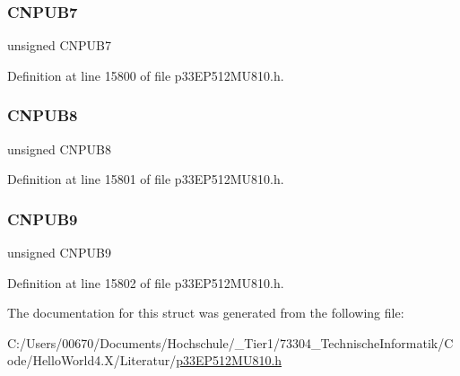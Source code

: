 \subsubsection{\texorpdfstring{C\+N\+P\+U\+B7}{CNPUB7}}
{\footnotesize\ttfamily unsigned C\+N\+P\+U\+B7}



Definition at line 15800 of file p33\+E\+P512\+M\+U810.\+h.

\mbox{\label{structtag_c_n_p_u_b_b_i_t_s_aaae4caa65429753f8714c166e77202b1}} 
\subsubsection{\texorpdfstring{C\+N\+P\+U\+B8}{CNPUB8}}
{\footnotesize\ttfamily unsigned C\+N\+P\+U\+B8}



Definition at line 15801 of file p33\+E\+P512\+M\+U810.\+h.

\mbox{\label{structtag_c_n_p_u_b_b_i_t_s_acc20cf498490985873d647d5b7cceebb}} 
\subsubsection{\texorpdfstring{C\+N\+P\+U\+B9}{CNPUB9}}
{\footnotesize\ttfamily unsigned C\+N\+P\+U\+B9}



Definition at line 15802 of file p33\+E\+P512\+M\+U810.\+h.



The documentation for this struct was generated from the following file\+:\begin{DoxyCompactItemize}
\item 
C\+:/\+Users/00670/\+Documents/\+Hochschule/\+\_\+\+Tier1/73304\+\_\+\+Technische\+Informatik/\+Code/\+Hello\+World4.\+X/\+Literatur/\hyperlink{p33_e_p512_m_u810_8h}{p33\+E\+P512\+M\+U810.\+h}\end{DoxyCompactItemize}
